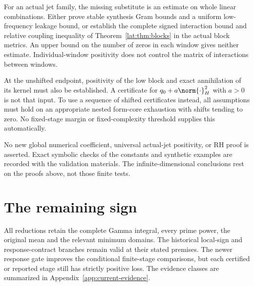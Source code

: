 \documentclass[11pt,a4paper]{article}
\numberwithin{equation}{section}
\theoremstyle{definition}\newtheorem{definition}[theorem]{Definition}
\theoremstyle{remark}\newtheorem{remark}[theorem]{Remark}
\begin{document}
For an actual jet family, the missing substitute is an estimate on whole
linear combinations. Either prove stable synthesis Gram bounds and a
uniform low-frequency leakage bound, or establish the complete signed
interaction bound and relative coupling inequality of
Theorem~\ref{lat:thm:blocks} in the actual block metrics. An upper bound on the
number of zeros in each window gives neither estimate. Individual-window
positivity does not control the matrix of interactions between windows.

At the unshifted endpoint, positivity of the low block and exact
annihilation of its kernel must also be established. A certificate for
$q_0+a\norm{\cdot}_H^2$ with $a>0$ is not that input. To use a sequence of
shifted certificates instead, all assumptions must hold on an appropriate
nested form-core exhaustion with shifts tending to zero. No fixed-stage
margin or fixed-complexity threshold supplies this automatically.

No new global numerical coefficient, universal actual-jet positivity,
or RH proof is asserted. Exact symbolic checks of the constants and synthetic examples are recorded with the validation materials. The infinite-dimensional conclusions rest on the proofs above, not those finite tests.


\section{The remaining sign}\label{sec:remaining}
All reductions retain the complete Gamma integral, every prime power, the original mean and the relevant minimum domains. The historical local-sign and response-contract branches remain valid at their stated premises. The newer response gate improves the conditional finite-stage comparisons, but each certified or reported stage still has strictly positive loss. The evidence classes are summarized in Appendix~\ref{app:current-evidence}.
\end{document}
